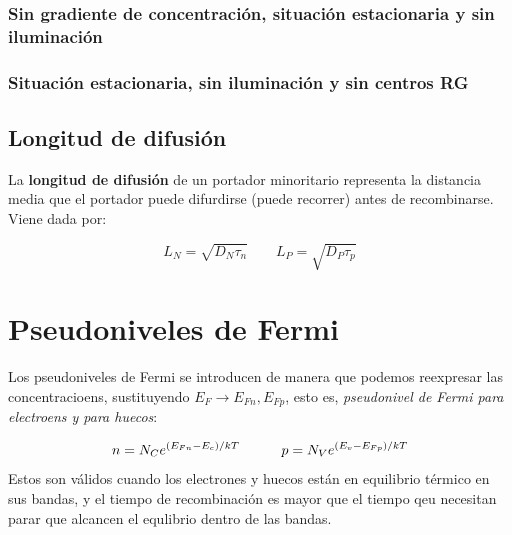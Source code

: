\subsubsection{Sin gradiente de concentración, situación estacionaria y sin iluminación}

\subsubsection{Situación estacionaria, sin iluminación y sin centros RG}

\subsection{Longitud de difusión}

La \textbf{longitud de difusión} de un portador minoritario representa la distancia media que el portador puede difurdirse (puede recorrer) antes de recombinarse. Viene dada por:

\begin{equation}
	L_N = \sqrt{D_N \tau_n} \qquad  L_P = \sqrt{D_P \tau_p}
\end{equation}




\section{Pseudoniveles de Fermi}

Los pseudoniveles de Fermi se introducen de manera que podemos reexpresar las concentracioens, sustituyendo $E_F\rightarrow E_{Fn},E_{Fp}$, esto es, \textit{pseudonivel de Fermi para electroens y para huecos}:

\begin{equation}
	n=N_C e^{(E_{Fn}-E_c)/kT} \quad \quad \quad 
	p=N_V e^{(E_{v}-E_{Fp})/kT}
\end{equation}
Estos son válidos cuando los electrones y huecos están en equilibrio térmico en sus bandas, y el tiempo de recombinación es mayor que el tiempo qeu necesitan parar que alcancen el equlibrio dentro de las bandas.

